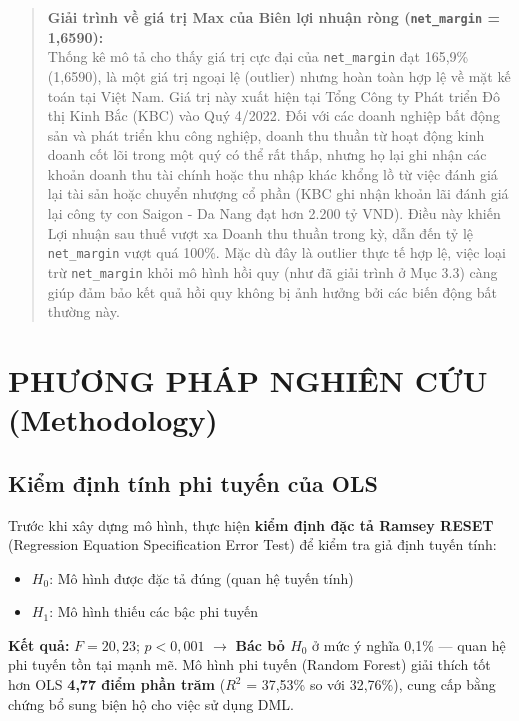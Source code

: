 \documentclass[12pt,a4paper]{article}
\begin{document}
\begin{quote}
\textbf{Giải trình về giá trị Max của Biên lợi nhuận ròng (\texttt{net\_margin} = 1,6590):} \\
Thống kê mô tả cho thấy giá trị cực đại của \texttt{net\_margin} đạt 165,9\% (1,6590), là một giá trị ngoại lệ (outlier) nhưng hoàn toàn hợp lệ về mặt kế toán tại Việt Nam. Giá trị này xuất hiện tại Tổng Công ty Phát triển Đô thị Kinh Bắc (KBC) vào Quý 4/2022. Đối với các doanh nghiệp bất động sản và phát triển khu công nghiệp, doanh thu thuần từ hoạt động kinh doanh cốt lõi trong một quý có thể rất thấp, nhưng họ lại ghi nhận các khoản doanh thu tài chính hoặc thu nhập khác khổng lồ từ việc đánh giá lại tài sản hoặc chuyển nhượng cổ phần (KBC ghi nhận khoản lãi đánh giá lại công ty con Saigon - Da Nang đạt hơn 2.200 tỷ VND). Điều này khiến Lợi nhuận sau thuế vượt xa Doanh thu thuần trong kỳ, dẫn đến tỷ lệ \texttt{net\_margin} vượt quá 100\%. Mặc dù đây là outlier thực tế hợp lệ, việc loại trừ \texttt{net\_margin} khỏi mô hình hồi quy (như đã giải trình ở Mục 3.3) càng giúp đảm bảo kết quả hồi quy không bị ảnh hưởng bởi các biến động bất thường này.
\end{quote}

\section{PHƯƠNG PHÁP NGHIÊN CỨU (Methodology)}

\subsection{Kiểm định tính phi tuyến của OLS}
Trước khi xây dựng mô hình, thực hiện \textbf{kiểm định đặc tả Ramsey RESET} (Regression Equation Specification Error Test) để kiểm tra giả định tuyến tính:
\begin{itemize}
    \item $H_0$: Mô hình được đặc tả đúng (quan hệ tuyến tính)
    \item $H_1$: Mô hình thiếu các bậc phi tuyến
\end{itemize}
\textbf{Kết quả:} $F = 20,23$; $p < 0,001$ $\rightarrow$ \textbf{Bác bỏ $H_0$} ở mức ý nghĩa 0,1\% --- quan hệ phi tuyến tồn tại mạnh mẽ.
Mô hình phi tuyến (Random Forest) giải thích tốt hơn OLS \textbf{4,77 điểm phần trăm} ($R^2$ = 37,53\% so với 32,76\%), cung cấp bằng chứng bổ sung biện hộ cho việc sử dụng DML.
\end{document}
